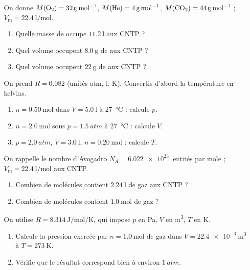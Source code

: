 \documentclass[11pt,a4paper]{article}
\begin{document}
\begin{exo}
On donne $M(\ce{O2})=\qty{32}{\gram\per\mole}$, $M(\ce{He})=\qty{4}{\gram\per\mole}$,
$M(\ce{CO2})=\qty{44}{\gram\per\mole}$ ; $V_{\mathrm{m}}=\qty{22.4}{\litre\per\mole}$.
\begin{enumerate}[label=\alph*)]
  \item Quelle masse de  occupe $\qty{11.2}{\litre}$ aux CNTP ?
  \item Quel volume occupent $\qty{8.0}{\gram}$ de  aux CNTP ?
  \item Quel volume occupent $\qty{22}{\gram}$ de  aux CNTP ?
\end{enumerate}
\end{exo}

\begin{exo}
On prend $R=\num{0,082}$ (unités \si{atm}, \si{\litre}, \si{\kelvin}). Convertis d'abord la
température en kelvins.
\begin{enumerate}[label=\alph*)]
  \item $n=\qty{0.50}{\mole}$ dans $V=\qty{5.0}{\litre}$ à \qty{27}{\degreeCelsius} : calcule $p$.
  \item $n=\qty{2.0}{\mole}$ sous $p=\qty{1.5}{atm}$ à \qty{27}{\degreeCelsius} : calcule $V$.
  \item $p=\qty{2.0}{atm}$, $V=\qty{3.0}{\litre}$, $n=\qty{0.20}{\mole}$ : calcule $T$.
\end{enumerate}
\end{exo}

\begin{exo}
On rappelle le nombre d'Avogadro $N_A=\qty{6.022e23}{}$ entités par mole ; $V_{\mathrm{m}}=\qty{22.4}{\litre\per\mole}$
aux CNTP.
\begin{enumerate}[label=\alph*)]
  \item Combien de molécules contient $\qty{2.24}{\litre}$ de gaz aux CNTP ?
  \item Combien de molécules contient $\qty{1.0}{\mole}$ de gaz ?
\end{enumerate}
\end{exo}

\begin{exo}[travailler en unités SI ($R=\num{8,314}$)]
On utilise $R=\qty{8.314}{\joule\per\mole\per\kelvin}$, qui impose $p$ en \si{\pascal}, $V$ en
\si{\meter\cubed}, $T$ en \si{\kelvin}.
\begin{enumerate}[label=\alph*)]
  \item Calcule la pression exercée par $n=\qty{1.0}{\mole}$ de gaz dans
        $V=\qty{22.4e-3}{\meter\cubed}$ à $T=\qty{273}{\kelvin}$.
  \item Vérifie que le résultat correspond bien à environ $\qty{1}{atm}$.
\end{enumerate}
\end{exo}
\end{document}
